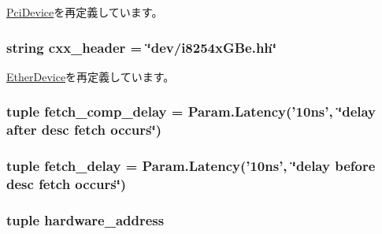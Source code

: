 \hyperlink{classPci_1_1PciDevice_a9222bb7cddf99c695b0430f560974967}{PciDevice}を再定義しています。\hypertarget{classEthernet_1_1IGbE_a17da7064bc5c518791f0c891eff05fda}{
\subsubsection[{cxx\_\-header}]{\setlength{\rightskip}{0pt plus 5cm}string {\bf cxx\_\-header} = \char`\"{}dev/i8254xGBe.hh\char`\"{}}}
\label{classEthernet_1_1IGbE_a17da7064bc5c518791f0c891eff05fda}


\hyperlink{classEthernet_1_1EtherDevice_a17da7064bc5c518791f0c891eff05fda}{EtherDevice}を再定義しています。\hypertarget{classEthernet_1_1IGbE_a8ea83cf2b342645e3b64cfdb0d7491ab}{
\subsubsection[{fetch\_\-comp\_\-delay}]{\setlength{\rightskip}{0pt plus 5cm}tuple {\bf fetch\_\-comp\_\-delay} = Param.Latency('10ns', \char`\"{}delay after desc fetch occurs\char`\"{})}}
\label{classEthernet_1_1IGbE_a8ea83cf2b342645e3b64cfdb0d7491ab}
\hypertarget{classEthernet_1_1IGbE_a5ec3e22fb226d90eb90ec108240d90a1}{
\subsubsection[{fetch\_\-delay}]{\setlength{\rightskip}{0pt plus 5cm}tuple {\bf fetch\_\-delay} = Param.Latency('10ns', \char`\"{}delay before desc fetch occurs\char`\"{})}}
\label{classEthernet_1_1IGbE_a5ec3e22fb226d90eb90ec108240d90a1}
\hypertarget{classEthernet_1_1IGbE_a0a01a2a0083560db04121eeee8c8e9fe}{
\subsubsection[{hardware\_\-address}]{\setlength{\rightskip}{0pt plus 5cm}tuple {\bf hardware\_\-address}}}
